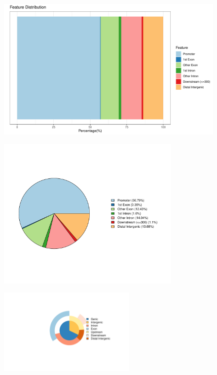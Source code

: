 \documentclass[UTF8]{ctexart}
\begin{document}
\begin{figure}
	\centering
	\includegraphics[width=\textwidth]{img/peaks_feature_distribution.pdf}
\end{figure}

\begin{figure}
	\centering
	\includegraphics[width=0.8\textwidth]{img/peaks_pie.pdf}
\end{figure}

\begin{figure}
	\centering
	\includegraphics[width=0.6\textwidth]{img/peaks_vennpie.pdf}
\end{figure}
\end{document}
